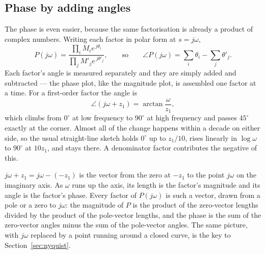 \documentclass[11pt]{article}
\begin{document}
\subsection{Phase by adding angles}\label{sec:phase}
The phase is even easier, because the same factorisation is already a product of
complex numbers. Writing each factor in polar form at $s=j\omega$,
\[
   P(j\omega)
   = \frac{\prod_i M_i e^{\,j\theta_i}}{\prod_j M'_j e^{\,j\theta'_j}} ,
   \qquad\text{so}\qquad
   \angle P(j\omega) = \sum_i \theta_i - \sum_j \theta'_j .
\]
Each factor's angle is measured separately and they are simply added and
subtracted --- the phase plot, like the magnitude plot, is assembled one factor at
a time. For a first-order factor the angle is
\[
   \angle(j\omega+z_1) = \arctan\frac{\omega}{z_1},
\]
which climbs from $0^\circ$ at low frequency to $90^\circ$ at high frequency and
passes $45^\circ$ exactly at the corner. Almost all of the change happens within a
decade on either side, so the usual straight-line sketch holds $0^\circ$ up to
$z_1/10$, rises linearly in $\log\omega$ to $90^\circ$ at $10z_1$, and stays there.
A denominator factor contributes the negative of this.

\begin{remark}\label{rem:vectors}
$j\omega+z_1 = j\omega-(-z_1)$ is the vector from the zero at $-z_1$ to the point
$j\omega$ on the imaginary axis. As $\omega$ runs up the axis, its length is the
factor's magnitude and its angle is the factor's phase. Every factor of
$P(j\omega)$ is such a vector, drawn from a pole or a zero to $j\omega$: the
magnitude of $P$ is the product of the zero-vector lengths divided by the product
of the pole-vector lengths, and the phase is the sum of the zero-vector angles
minus the sum of the pole-vector angles. The same picture, with $j\omega$ replaced
by a point running around a closed curve, is the key to
Section~\ref{sec:nyquist}.
\end{remark}

\end{document}
